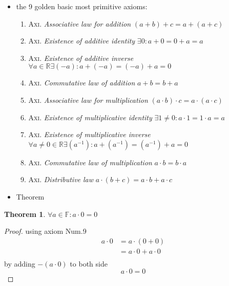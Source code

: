 \documentclass[11pt, a4paper]{article}
\newtheorem{theorem}{Theorem}
\begin{document}
\begin{itemize}
\item the 9 golden basic most primitive axioms:
\begin{enumerate}
\item \textsc{Axi}. \emph{Associative law for addition} \(( a + b) + c = a + ( a + c )\)
\item \textsc{Axi}. \emph{Existence of additive identity} \(\exists 0:  a + 0 = 0 + a = a\)
\item \textsc{Axi}. \emph{Existence of additive inverse} \(\forall a \in \mathbb{R} \exists (-a) : a + (-a) = (-a) + a = 0\)
\item \textsc{Axi}. \emph{Commutative law of addition} \(a + b = b + a\)
\item \textsc{Axi}. \emph{Associative law for multiplication} \(( a \cdot b) \cdot c = a \cdot ( a \cdot c )\)
\item \textsc{Axi}. \emph{Existence of multiplicative identity} \(\exists 1 \neq 0:  a \cdot 1 = 1 \cdot a = a\)
\item \textsc{Axi}. \emph{Existence of multiplicative inverse} \(\forall a \neq 0 \in \mathbb{R} \exists (a^{-1}) : a + (a^{-1}) = (a^{-1}) + a = 0\)
\item \textsc{Axi}. \emph{Commutative law of multiplication} \(a \cdot b = b \cdot a\)
\item \textsc{Axi}. \emph{Distributive law} \(a \cdot ( b + c ) = a \cdot b + a \cdot c\)
\end{enumerate}

\item Theorem
\end{itemize}

\begin{theorem}
  $ \forall a \in \mathbb{F}: a \cdot 0 = 0 $
\end{theorem}

\begin{proof}
  using axiom Num.9
  \begin{align*}
    a \cdot 0 &= a \cdot (0 + 0) \\
          &= a \cdot 0 + a \cdot 0 \\
  \end{align*}
by adding $-(a \cdot 0)$ to both side
\[ a \cdot 0 = 0 \]
\end{proof}
\end{document}
